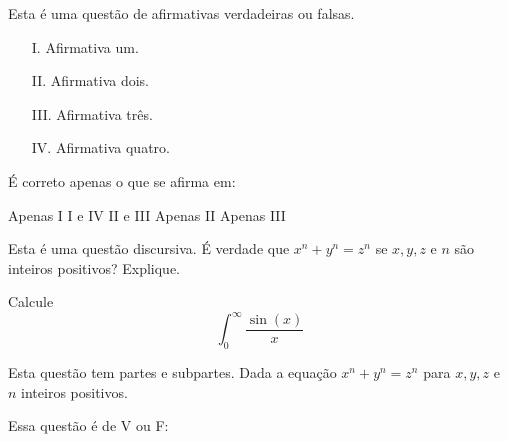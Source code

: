 \newpage
\question
Esta é uma questão de afirmativas verdadeiras ou falsas.
\begin{itemize}
\item[I.] Afirmativa um.
\item[II.] Afirmativa dois.
\item[III.] Afirmativa três.
\item[IV.] Afirmativa quatro.
\end{itemize}
É correto apenas o que se afirma em:
\begin{choices}
\choice Apenas I
\choice I e IV
\CorrectChoice II e III
\choice Apenas II
\choice Apenas III
\end{choices}

\question
Esta é uma questão discursiva. É verdade que \(x^n + y^n = z^n\) se \(x,y,z\)
e \(n\) são inteiros positivos? Explique.
\treslinhas

\question
Calcule \[\int_{0}^{\infty} \frac{\sin(x)}{x}\]
\vspace{3cm}

\question 
Esta questão tem partes e subpartes. Dada a equação \(x^n + y^n = z^n\) para
\(x,y,z\) e \(n\) inteiros positivos.


\newpage
\question
Essa questão é de V ou F:

